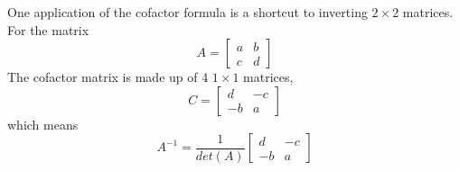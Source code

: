 One application of the cofactor formula is a shortcut to inverting $2 \times 2$ matrices. 
For the matrix 
$$A = \begin{bmatrix}
a & b \\
c & d
\end{bmatrix}$$
The cofactor matrix is made up of 4 $1 \times 1$ matrices,
$$C = \begin{bmatrix}
d & -c \\
-b & a
\end{bmatrix}$$
which means 
$$A^{-1} = \frac{1}{det(A)} \begin{bmatrix}
d & -c \\
-b & a
\end{bmatrix}$$





